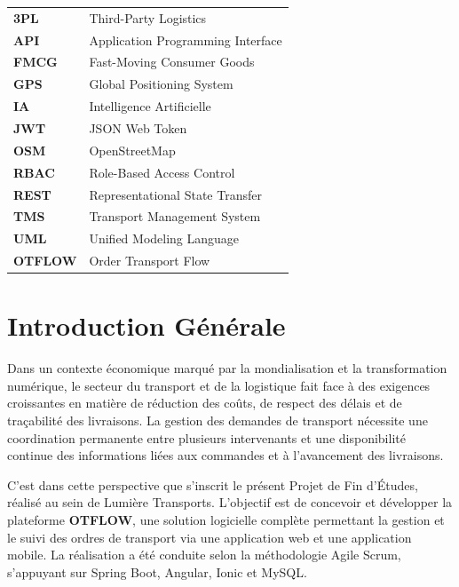 \documentclass[12pt,a4paper,oneside]{report}
\begin{document}
\begin{longtable}{p{3.5cm}p{10.5cm}}
\textbf{3PL}   & Third-Party Logistics \\
\textbf{API}   & Application Programming Interface \\
\textbf{FMCG}  & Fast-Moving Consumer Goods \\
\textbf{GPS}   & Global Positioning System \\
\textbf{IA}    & Intelligence Artificielle \\
\textbf{JWT}   & JSON Web Token \\
\textbf{OSM}   & OpenStreetMap \\
\textbf{RBAC}  & Role-Based Access Control \\
\textbf{REST}  & Representational State Transfer \\
\textbf{TMS}   & Transport Management System \\
\textbf{UML}   & Unified Modeling Language \\
\textbf{OTFLOW} & Order Transport Flow \\
\end{longtable}

\clearpage
{}
\setcounter{page}{1}

\chapter*{Introduction Générale}

Dans un contexte économique marqué par la mondialisation et la transformation numérique, le secteur du transport et de la logistique fait face à des exigences croissantes en matière de réduction des coûts, de respect des délais et de traçabilité des livraisons. La gestion des demandes de transport nécessite une coordination permanente entre plusieurs intervenants et une disponibilité continue des informations liées aux commandes et à l'avancement des livraisons.

C'est dans cette perspective que s'inscrit le présent Projet de Fin d'Études, réalisé au sein de Lumière Transports. L'objectif est de concevoir et développer la plateforme \textbf{OTFLOW}, une solution logicielle complète permettant la gestion et le suivi des ordres de transport via une application web et une application mobile. La réalisation a été conduite selon la méthodologie Agile Scrum, s'appuyant sur Spring Boot, Angular, Ionic et MySQL.
\end{document}
